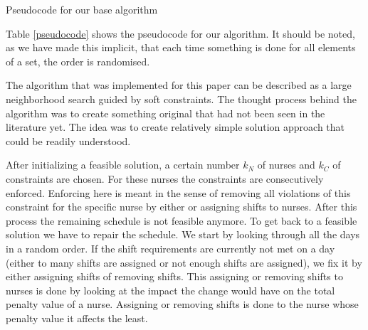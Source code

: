 \documentclass{article}
\begin{document}
\begin{table}
\begin{algorithm}[H]
\DontPrintSemicolon
{}
\end{algorithm}
	\caption{Pseudocode for our base algorithm}
	\label{pseudocode}
\end{table}

Table \ref{pseudocode} shows the pseudocode for our algorithm.
It should be noted, as we have made this implicit, that each time something is done for all elements of a set, the order is randomised.

The algorithm that was implemented for this paper can be described as a large neighborhood search guided by soft constraints.
The thought process behind the algorithm was to create something original that had not been seen in the literature yet.
The idea was to create relatively simple solution approach that could be readily understood.

After initializing a feasible solution, a certain number $k_N$ of nurses and $k_C$ of constraints are chosen.
For these nurses the constraints are consecutively enforced.
Enforcing here is meant in the sense of removing all violations of this constraint for the specific nurse by either or assigning shifts to nurses.
After this process the remaining schedule is not feasible anymore.
To get back to a feasible solution we have to repair the schedule. We start by looking through all the days in a random order.
If the shift requirements are currently not met on a day (either to many shifts are assigned or not enough shifts are assigned), we fix it by either assigning shifts of removing shifts. This assigning or removing shifts to nurses is done by looking at the impact the change would have on the total penalty value of a nurse.
Assigning or removing shifts is done to the nurse whose penalty value it affects the least.
\end{document}
